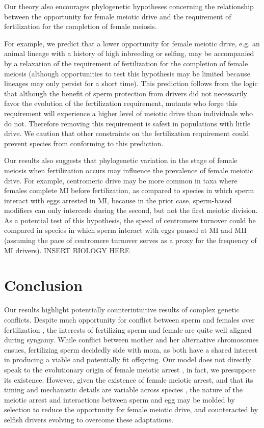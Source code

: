 \documentclass[12pt,letterpaper]{article}
\newcommand{\yb}[1]{{ \color{blue} #1}}
\begin{document}
Our theory also encourages phylogenetic hypotheses concerning the relationship between the opportunity 
	for female meiotic drive and the requirement of fertilization for the completion of female meiosis. 

\yb{
For example, we predict that a lower opportunity for female meiotic drive,
        e.g. an animal lineage with a history of high inbreeding or selfing, 
        may be accompanied by a relaxation of the requirement of fertilization for the
        completion of female meiosis (although 
        opportunities to test this hypothesis may be limited because 
        lineages may only persist for a short time). 
This prediction follows from the logic that although the benefit of sperm protection from drivers did not necessarily favor the evolution of the fertilization requirement, 
	mutants who forge this requirement will experience a higher level of meiotic drive than individuals who do not.  
Therefore removing this requirement is safest in populations with little drive. 
We caution that other constraints on the fertilization requirement could prevent species from conforming to this prediction.
}

 
Our results also suggests that phylogenetic variation in the stage of female meiosis when
        fertilization occurs may influence the prevalence of  female meiotic drive.
For example, centromeric drive may be more common  in taxa where females complete MI before fertilization, 
	as compared to species in which sperm interact with eggs arrested  in MI, 
	because in the prior case, sperm-based modifiers can only intercede during the second, but not the first  meiotic division. 
As a potential test of this hypothesis, the speed of centromere
	turnover could be compared in species in which sperm interact with eggs paused at MI and MII 
	(assuming the pace of centromere turnover serves as a proxy for the frequency of MI drivers). 
\yb{INSERT BIOLOGY HERE}
\newline


\section*{Conclusion}
Our results highlight potentially counterintuitive results of complex genetic conflicts. 
Despite much opportunity for conflict between sperm and females over fertilization \citep{Partridge1998},
	the interests of fertilizing sperm and female are quite well aligned during syngamy.
While conflict between mother and her alternative chromosomes ensues, 
	fertilizing sperm decidedly side with mom, as both have a shared interest in producing a viable and potentially fit offspring. 
Our model does not directly speak to the evolutionary origin of
  female meiotic arrest \citep[for a review and evaluation of such
  hypotheses see][]{Mira1998}, in fact, we presuppose its existence.
However, given the existence of female meiotic arrest, 
	and that its timing and mechanistic details are variable across species \citep{Masui_book,Karrbook:09},
	the nature of the meiotic arrest and interactions between
        sperm and egg may  be molded by selection to reduce the opportunity for female meiotic drive, 
	and counteracted by selfish drivers evolving to overcome these adaptations. 
\end{document}
